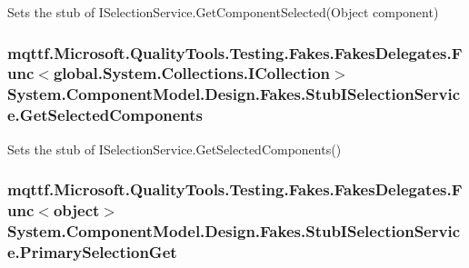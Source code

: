 Sets the stub of I\-Selection\-Service.\-Get\-Component\-Selected(\-Object component)

\hypertarget{class_system_1_1_component_model_1_1_design_1_1_fakes_1_1_stub_i_selection_service_af383e04b4fc7eb6fa79a93329a150d3b}{
\subsubsection[{Get\-Selected\-Components}]{\setlength{\rightskip}{0pt plus 5cm}mqttf.\-Microsoft.\-Quality\-Tools.\-Testing.\-Fakes.\-Fakes\-Delegates.\-Func$<$global.\-System.\-Collections.\-I\-Collection$>$ System.\-Component\-Model.\-Design.\-Fakes.\-Stub\-I\-Selection\-Service.\-Get\-Selected\-Components}}\label{class_system_1_1_component_model_1_1_design_1_1_fakes_1_1_stub_i_selection_service_af383e04b4fc7eb6fa79a93329a150d3b}


Sets the stub of I\-Selection\-Service.\-Get\-Selected\-Components()

\hypertarget{class_system_1_1_component_model_1_1_design_1_1_fakes_1_1_stub_i_selection_service_ad4a2c4fd61b45f7a77807422ff83f70f}{
\subsubsection[{Primary\-Selection\-Get}]{\setlength{\rightskip}{0pt plus 5cm}mqttf.\-Microsoft.\-Quality\-Tools.\-Testing.\-Fakes.\-Fakes\-Delegates.\-Func$<$object$>$ System.\-Component\-Model.\-Design.\-Fakes.\-Stub\-I\-Selection\-Service.\-Primary\-Selection\-Get}}\label{class_system_1_1_component_model_1_1_design_1_1_fakes_1_1_stub_i_selection_service_ad4a2c4fd61b45f7a77807422ff83f70f}



